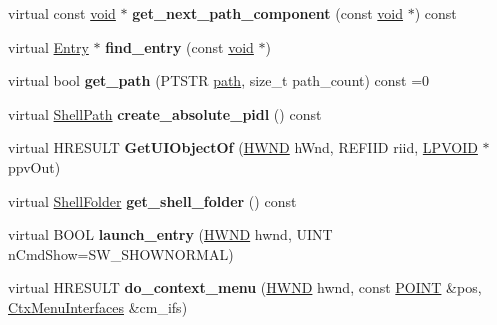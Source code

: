 \begin{DoxyCompactItemize}
virtual const \hyperlink{interfacevoid}{void} $\ast$ {\bfseries get\+\_\+next\+\_\+path\+\_\+component} (const \hyperlink{interfacevoid}{void} $\ast$) const
\item 
\mbox{\label{struct_entry_aaf1b856a1548daa6d0c40a3508b727fd}} 
virtual \hyperlink{struct_entry}{Entry} $\ast$ {\bfseries find\+\_\+entry} (const \hyperlink{interfacevoid}{void} $\ast$)
\item 
\mbox{\label{struct_entry_a9d3a58e86843290c945766dbbdcda69a}} 
virtual bool {\bfseries get\+\_\+path} (P\+T\+S\+TR \hyperlink{structpath}{path}, size\+\_\+t path\+\_\+count) const =0
\item 
\mbox{\label{struct_entry_ad63d0782dfeb7522c5fd81db55e7adf8}} 
virtual \hyperlink{struct_shell_path}{Shell\+Path} {\bfseries create\+\_\+absolute\+\_\+pidl} () const
\item 
\mbox{\label{struct_entry_a7128c668ed5172f4d0e555b1a176dc14}} 
virtual H\+R\+E\+S\+U\+LT {\bfseries Get\+U\+I\+Object\+Of} (\hyperlink{interfacevoid}{H\+W\+ND} h\+Wnd, R\+E\+F\+I\+ID riid, \hyperlink{interfacevoid}{L\+P\+V\+O\+ID} $\ast$ppv\+Out)
\item 
\mbox{\label{struct_entry_af66895f5ec5166037f667d23ca0407d0}} 
virtual \hyperlink{struct_shell_folder}{Shell\+Folder} {\bfseries get\+\_\+shell\+\_\+folder} () const
\item 
\mbox{\label{struct_entry_a24e77b870903275e7e6725cb08839938}} 
virtual B\+O\+OL {\bfseries launch\+\_\+entry} (\hyperlink{interfacevoid}{H\+W\+ND} hwnd, U\+I\+NT n\+Cmd\+Show=S\+W\+\_\+\+S\+H\+O\+W\+N\+O\+R\+M\+AL)
\item 
\mbox{\label{struct_entry_a874278e3a7716ac46ac8d256c5ce41dd}} 
virtual H\+R\+E\+S\+U\+LT {\bfseries do\+\_\+context\+\_\+menu} (\hyperlink{interfacevoid}{H\+W\+ND} hwnd, const \hyperlink{structtag_p_o_i_n_t}{P\+O\+I\+NT} \&pos, \hyperlink{struct_ctx_menu_interfaces}{Ctx\+Menu\+Interfaces} \&cm\+\_\+ifs)
\end{DoxyCompactItemize}
